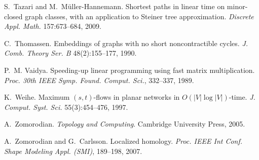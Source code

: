 \begin{thebibliography}{10}
S.~Tazari and M.~M{\"u}ller-Hannemann.
\newblock Shortest paths in linear time on minor-closed graph classes, with an
  application to {Steiner} tree approximation.
\newblock \emph{Discrete Appl. Math.} 157:673--684, 2009.

C.~Thomassen.
\newblock Embeddings of graphs with no short noncontractible cycles.
\newblock \emph{J. Comb. Theory Ser. B} 48(2):155--177, 1990.

P.~M. Vaidya.
\newblock Speeding-up linear programming using fast matrix multiplication.
\newblock \emph{Proc. 30th IEEE Symp. Found. Comput. Sci.}, 332--337, 1989.

K.~Weihe.
\newblock Maximum $(s, t)$-flows in planar networks in {$O(|V|\log|V|)$}-time.
\newblock \emph{J. Comput. Syst. Sci.} 55(3):454--476, 1997.

A.~Zomorodian.
\newblock \emph{Topology and Computing}.
\newblock Cambridge University Press, 2005.

A.~Zomorodian and G.~Carlsson.
\newblock Localized homology.
\newblock \emph{Proc. IEEE Int Conf. Shape Modeling Appl. (SMI)}, 189--198,
  2007.

\end{thebibliography}
